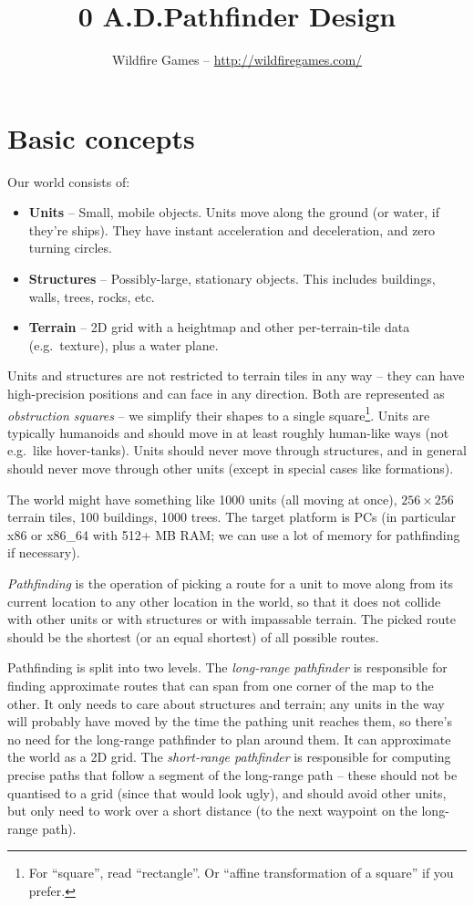 \documentclass[a4paper,10pt]{article}
\title{0 A.D.\@ Pathfinder Design}
\author{Wildfire Games -- \url{http://wildfiregames.com/}}
\begin{document}
\maketitle

\tableofcontents

\section{Basic concepts}

Our world consists of:
\begin{itemize}
 \item \textbf{Units} --
  Small, mobile objects.
  Units move along the ground (or water, if they're ships).
  They have instant acceleration and deceleration, and zero turning circles.
 \item \textbf{Structures} --
  Possibly-large, stationary objects.
  This includes buildings, walls, trees, rocks, etc.
 \item \textbf{Terrain} --
  2D grid with a heightmap and other per-terrain-tile data (e.g.\ texture),
  plus a water plane.
\end{itemize}

Units and structures are not restricted to terrain tiles in any way --
they can have high-precision positions and can face in any direction.
Both are represented as \emph{obstruction squares} -- we simplify their shapes to
a single square\footnote{For ``square'', read ``rectangle''. Or ``affine transformation of a square'' if you prefer.}.
Units are typically humanoids and should move in at least roughly human-like ways
(not e.g.\ like hover-tanks).
Units should never move through structures,
and in general should never move through other units (except in special cases like formations).

The world might have something like 1000 units (all moving at once),
$256\times256$ terrain tiles, 100 buildings, 1000 trees.
The target platform is PCs (in particular x86 or x86\_64 with 512+ MB RAM;
we can use a lot of memory for pathfinding if necessary).

\emph{Pathfinding} is the operation of picking a route for a unit to move along
from its current location to any other location in the world,
so that it does not collide with other units
or with structures or with impassable terrain.
The picked route should be the shortest (or an equal shortest) of all possible routes.

Pathfinding is split into two levels.
The \emph{long-range pathfinder} is responsible for finding approximate routes
that can span from one corner of the map to the other.
It only needs to care about structures and terrain;
any units in the way will probably have moved by the time the pathing unit reaches them,
so there's no need for the long-range pathfinder to plan around them.
It can approximate the world as a 2D grid.
The \emph{short-range pathfinder} is responsible for computing precise paths
that follow a segment of the long-range path --
these should not be quantised to a grid (since that would look ugly),
and should avoid other units,
but only need to work over a short distance (to the next waypoint on the long-range path).
\end{document}
